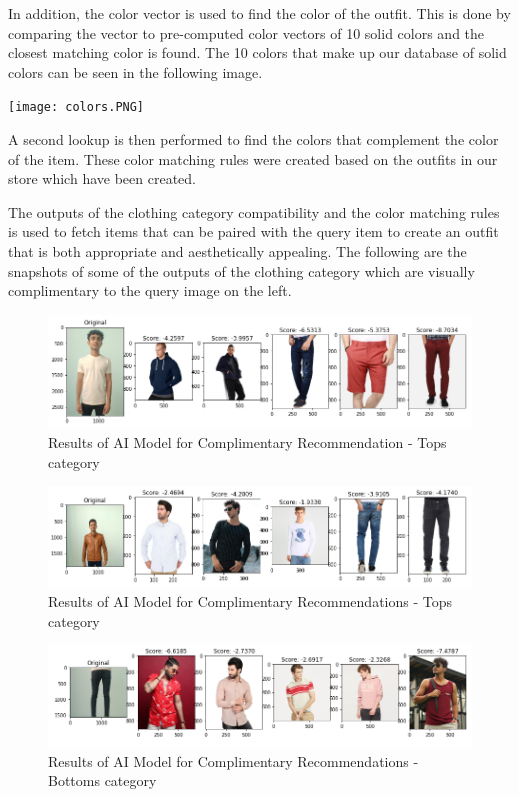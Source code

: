 In addition, the color vector is used to find the color of the outfit. This is done by comparing the vector to pre-computed color vectors of 10 solid colors and the closest matching color is found. The 10 colors that make up our database of solid colors can be seen in the following image.

\texttt{[image: colors.PNG]}

A second lookup is then performed to find the colors that complement the color of the item. These color matching rules were created based on the outfits in our store which have been created.

The outputs of the clothing category compatibility and the color matching rules is used to fetch items that can be paired with the query item to create an outfit that is both appropriate and aesthetically appealing. The following are the snapshots of some of the outputs of the clothing category which are visually complimentary to the query image on the left. 

\begin{figure}[H]
\includegraphics[width=12cm]{images/comp1.PNG} 
\centering
\caption{Results of AI Model for Complimentary Recommendation - Tops category}
\label{architecture}
\end{figure}

\begin{figure}[H]
\includegraphics[width=12cm]{images/comp2.PNG} 
\centering
\caption{Results of AI Model for Complimentary Recommendations - Tops category}
\label{architecture}
\end{figure}

\begin{figure}[H]
\includegraphics[width=12cm]{images/comp3.PNG} 
\centering
\caption{Results of AI Model for Complimentary Recommendations - Bottoms category}
\label{architecture}
\end{figure}

